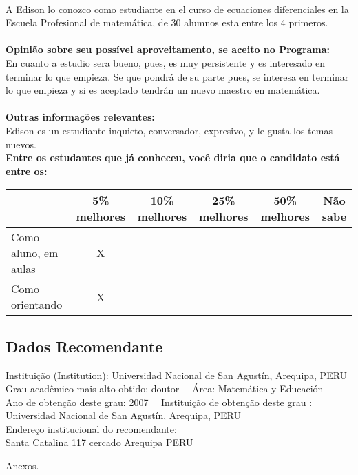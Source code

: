 \documentclass[11pt]{article}
\begin{document}
\\A Edison lo conozco como estudiante en el curso de ecuaciones diferenciales en la Escuela Profesional de matemática, de 30 alumnos esta entre los 4 primeros.\\
\\
\textbf{Opinião sobre seu possível aproveitamento, se aceito no Programa:}
\\En cuanto a estudio sera bueno, pues, es muy persistente y es interesado en terminar lo que empieza.
Se que pondrá de su parte pues, se interesa en terminar lo que empieza y 
si es aceptado tendrán un nuevo maestro en matemática.\\ 
\\
\textbf{Outras informações relevantes:} \\Edison es un estudiante inquieto, conversador, expresivo, y le gusta los temas nuevos.
\\[0.3cm]
\textbf{Entre os estudantes que já conheceu, você diria que o candidato está entre os:}
\\
\begin{tabular}{|l|c|c|c|c|c|}
\hline
 & 5\% melhores & 10\% melhores & 25\% melhores & 50\% melhores & Não sabe \\
\hline
Como aluno, em aulas & X &  &  &  & \\
\hline
Como orientando & X &  &  &  & \\
\hline
\end{tabular}
\subsection*{Dados Recomendante} 
	Instituição (Institution): Universidad Nacional de San Agustín, Arequipa, PERU
\\ 
	Grau acadêmico mais alto obtido: doutor
	\ \ Área: Matemática y Educación
	\\
	Ano de obtenção deste grau: 2007
	\ \ 
	Instituição de obtenção deste grau : Universidad Nacional de San Agustín, Arequipa, PERU
	\\ 
	Endereço institucional do recomendante: \\ Santa  Catalina 117   cercado
Arequipa PERU 
\begin{center}
Anexos.
\end{center}
\end{document}
